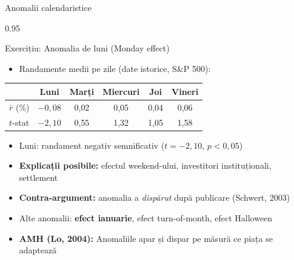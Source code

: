 \documentclass[9pt, aspectratio=169, t]{beamer}
\begin{document}
\begin{frame}[shrink=15]{Anomalii calendaristice}
\begin{cminipage}{0.95\textwidth}
\begin{block}{Exercițiu: Anomalia de luni (Monday effect)}
\begin{itemize}\setlength{\itemsep}{0pt}
    \item Randamente medii pe zile (date istorice, S\&P 500):
\end{itemize}
\renewcommand{\arraystretch}{1.2}
\begin{center}
\begin{tabular}{lccccc}
\toprule
 & Luni & Marți & Miercuri & Joi & Vineri \\
\midrule
$\bar{r}$ (\%) & $-0{,}08$ & 0{,}02 & 0{,}05 & 0{,}04 & 0{,}06 \\
$t$-stat & $-2{,}10$ & 0{,}55 & 1{,}32 & 1{,}05 & 1{,}58 \\
\bottomrule
\end{tabular}
\end{center}
\end{block}

\vspace{0.2cm}
\begin{itemize}\setlength{\itemsep}{0pt}
    \item Luni: randament negativ semnificativ ($t = -2{,}10$, $p < 0{,}05$)
    \item \textbf{Explicații posibile:} efectul weekend-ului, investitori instituționali, settlement
    \item \textbf{Contra-argument:} anomalia a \textit{dispărut} după publicare (Schwert, 2003)
    \item Alte anomalii: \textbf{efect ianuarie}, efect turn-of-month, efect Halloween
    \item \textbf{AMH (Lo, 2004):} Anomaliile apar și dispar pe măsură ce piața se adaptează
\end{itemize}
\end{cminipage}
\end{frame}
\end{document}

